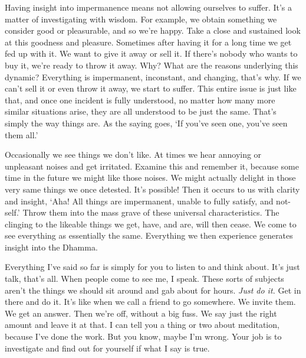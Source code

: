 Having insight into impermanence means not allowing ourselves to suffer. It's a matter of investigating with wisdom. For example, we obtain something we consider good or pleasurable, and so we're happy. Take a close and sustained look at this goodness and pleasure. Sometimes after having it for a long time we get fed up with it. We want to give it away or sell it. If there's nobody who wants to buy it, we're ready to throw it away. Why? What are the reasons underlying this dynamic? Everything is impermanent, inconstant, and changing, that's why. If we can't sell it or even throw it away, we start to suffer. This entire issue is just like that, and once one incident is fully understood, no matter how many more similar situations arise, they are all understood to be just the same. That's simply the way things are. As the saying goes, `If you've seen one, you've seen them all.'

Occasionally we see things we don't like. At times we hear annoying or unpleasant noises and get irritated. Examine this and remember it, because some time in the future we might like those noises. We might actually delight in those very same things we once detested. It's possible! Then it occurs to us with clarity and insight, `Aha! All things are impermanent, unable to fully satisfy, and not-self.' Throw them into the mass grave of these universal characteristics. The clinging to the likeable things we get, have, and are, will then cease. We come to see everything as essentially the same. Everything we then experience generates insight into the Dhamma.

Everything I've said so far is simply for you to listen to and think about. It's just talk, that's all. When people come to see me, I speak. These sorts of subjects aren't the things we should sit around and gab about for hours. \textit{Just do it.} Get in there and do it. It's like when we call a friend to go somewhere. We invite them. We get an answer. Then we're off, without a big fuss. We say just the right amount and leave it at that. I can tell you a thing or two about meditation, because I've done the work. But you know, maybe I'm wrong. Your job is to investigate and find out for yourself if what I say is true. 
